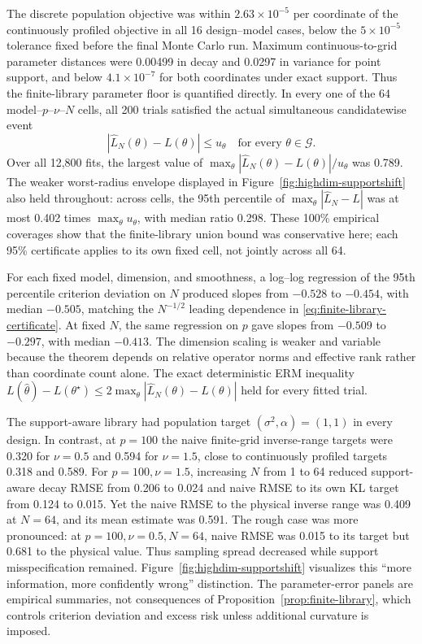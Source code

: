 \documentclass[11pt]{article}
\theoremstyle{remark}
\begin{document}
The discrete population objective was within \(2.63\times10^{-5}\) per
coordinate of the continuously profiled objective in all 16 design--model
cases, below the \(5\times10^{-5}\) tolerance fixed before the final Monte
Carlo run. Maximum continuous-to-grid parameter distances were 0.00499 in
decay and 0.0297 in variance for point support, and below
\(4.1\times10^{-7}\) for both coordinates under exact support. Thus the
finite-library parameter floor is quantified directly. In every one of the 64 model--\(p\)--\(\nu\)--\(N\) cells, all
200 trials satisfied the actual simultaneous candidatewise event
\[
  |\widehat L_N(\theta)-L(\theta)|\leq u_\theta
  \quad\text{for every }\theta\in\mathcal G.
\]
Over all 12,800 fits, the largest value of
\(\max_\theta|\widehat L_N(\theta)-L(\theta)|/u_\theta\) was 0.789.  The
weaker worst-radius envelope displayed in
Figure~\ref{fig:highdim-supportshift} also held throughout: across cells, the
95th percentile of \(\max_\theta|\widehat L_N-L|\) was at most 0.402 times
\(\max_\theta u_\theta\), with median ratio 0.298.  These 100\% empirical
coverages show that the finite-library union bound was conservative here; each
95\% certificate applies to its own fixed cell, not jointly across all 64.

For each fixed model, dimension, and smoothness, a log--log regression of the
95th percentile criterion deviation on \(N\) produced slopes from \(-0.528\)
to \(-0.454\), with median \(-0.505\), matching the \(N^{-1/2}\) leading
dependence in \eqref{eq:finite-library-certificate}. At fixed \(N\), the same
regression on \(p\) gave slopes from \(-0.509\) to \(-0.297\), with median
\(-0.413\). The dimension scaling is weaker and variable because the theorem
depends on relative operator norms and effective rank rather than coordinate
count alone. The exact deterministic
ERM inequality
\(L(\widehat\theta)-L(\theta^\star)\leq
2\max_\theta|\widehat L_N(\theta)-L(\theta)|\) held for every fitted trial.

The support-aware library had population target \((\sigma^2,\alpha)=(1,1)\) in every
design.  In contrast, at \(p=100\) the naive finite-grid inverse-range targets
were 0.320 for \(\nu=0.5\) and 0.594 for \(\nu=1.5\), close to continuously
profiled targets 0.318 and 0.589.  For \(p=100,\nu=1.5\), increasing \(N\)
from 1 to 64 reduced support-aware decay RMSE from 0.206 to 0.024 and naive
RMSE to its own KL target from 0.124 to 0.015.  Yet the naive RMSE to the
physical inverse range was 0.409 at \(N=64\), and its mean estimate was 0.591.
The rough case was more pronounced: at \(p=100,\nu=0.5,N=64\), naive RMSE was
0.015 to its target but 0.681 to the physical value.  Thus sampling spread
decreased while support misspecification remained.
Figure~\ref{fig:highdim-supportshift}
visualizes this ``more information, more confidently wrong'' distinction.  The
parameter-error panels are empirical summaries, not consequences of
Proposition~\ref{prop:finite-library}, which controls criterion deviation and
excess risk unless additional curvature is imposed.
\end{document}

